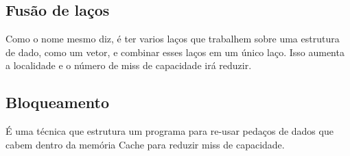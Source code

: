 \documentclass[12pt]{article}
\begin{document}
\subsection{Fusão de laços}

Como o nome mesmo diz, é ter varios laços que trabalhem sobre uma estrutura de
dado, como um vetor, e combinar esses laços em um único laço. Isso aumenta a
localidade e o número de miss de capacidade irá reduzir.

\subsection{Bloqueamento}

É uma técnica que estrutura um programa para re-usar pedaços de dados que cabem
dentro da memória Cache para reduzir miss de capacidade.
\end{document}
